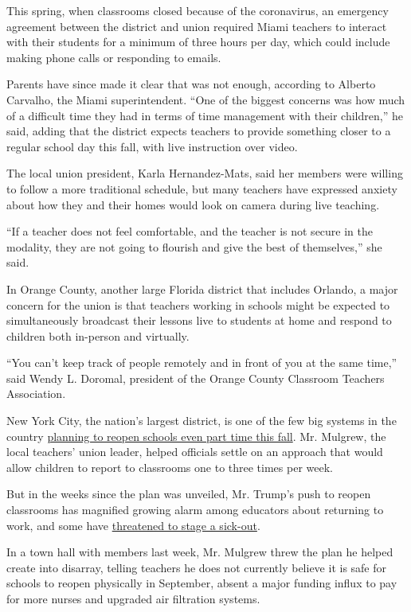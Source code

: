 This spring, when classrooms closed because of the coronavirus, an
emergency agreement between the district and union required Miami
teachers to interact with their students for a minimum of three hours
per day, which could include making phone calls or responding to emails.

Parents have since made it clear that was not enough, according to
Alberto Carvalho, the Miami superintendent. ``One of the biggest
concerns was how much of a difficult time they had in terms of time
management with their children,'' he said, adding that the district
expects teachers to provide something closer to a regular school day
this fall, with live instruction over video.

The local union president, Karla Hernandez-Mats, said her members were
willing to follow a more traditional schedule, but many teachers have
expressed anxiety about how they and their homes would look on camera
during live teaching.

``If a teacher does not feel comfortable, and the teacher is not secure
in the modality, they are not going to flourish and give the best of
themselves,'' she said.

In Orange County, another large Florida district that includes Orlando,
a major concern for the union is that teachers working in schools might
be expected to simultaneously broadcast their lessons live to students
at home and respond to children both in-person and virtually.

``You can't keep track of people remotely and in front of you at the
same time,'' said Wendy L. Doromal, president of the Orange County
Classroom Teachers Association.

New York City, the nation's largest district, is one of the few big
systems in the country
\href{https://www.nytimes.com/2020/07/08/nyregion/nyc-schools-reopening-plan.html}{planning
to reopen schools even part time this fall}. Mr. Mulgrew, the local
teachers' union leader, helped officials settle on an approach that
would allow children to report to classrooms one to three times per
week.

But in the weeks since the plan was unveiled, Mr. Trump's push to reopen
classrooms has magnified growing alarm among educators about returning
to work, and some have
\href{https://twitter.com/Liat_RO/status/1281288365472649216}{threatened
to stage a sick-out}.

In a town hall with members last week, Mr. Mulgrew threw the plan he
helped create into disarray, telling teachers he does not currently
believe it is safe for schools to reopen physically in September, absent
a major funding influx to pay for more nurses and upgraded air
filtration systems.

